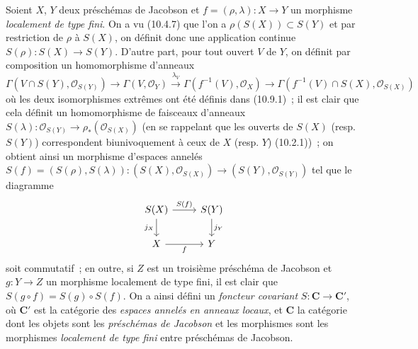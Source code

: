 \begin{env}[10.9.2]
\label{IV.10.9.2-fr}
Soient $X$, $Y$ deux préschémas de Jacobson et
$f=(\rho,\lambda):X\to Y$ un morphisme \emph{localement de type fini}. On a vu
(10.4.7) que l'on a $\rho(S(X))\subset S(Y)$ et par restriction de $\rho$ à
$S(X)$, on définit donc une application continue $S(\rho):S(X)\to S(Y)$.
D'autre part, pour tout ouvert $V$ de $Y$, on définit par composition un
homomorphisme d'anneaux
\[
  \Gamma(V\cap S(Y),\mathcal O_{S(Y)})\longrightarrow
  \Gamma(V,\mathcal O_Y)\xrightarrow{\lambda_V}
  \Gamma(f^{-1}(V),\mathcal O_X)\longrightarrow
  \Gamma(f^{-1}(V)\cap S(X),\mathcal O_{S(X)})
\]
où les deux isomorphismes extrêmes ont été définis dans (10.9.1)~; il est clair
que cela définit un homomorphisme de faisceaux d'anneaux
$S(\lambda):\mathcal O_{S(Y)}\to\rho_*(\mathcal O_{S(X)})$ (en se rappelant
que les ouverts de $S(X)$ (resp. $S(Y)$) correspondent biunivoquement à ceux de
$X$ (resp. $Y$) (10.2.1))~; on obtient ainsi un morphisme d'espaces annelés
$S(f)=(S(\rho),S(\lambda)):(S(X),\mathcal O_{S(X)})\longrightarrow
  (S(Y),\mathcal O_{S(Y)})$
tel que le diagramme
\[
\begin{tikzcd}
S(X) \ar[r,"S(f)"] \ar[d,"j_X"'] & S(Y) \ar[d,"j_Y"] \\
X \ar[r,"f"'] & Y
\end{tikzcd}
\]
soit commutatif~; en outre, si $Z$ est un troisième préschéma de Jacobson et
$g:Y\to Z$ un morphisme localement de type fini, il est clair que
$S(g\circ f)=S(g)\circ S(f)$. On a ainsi défini un \emph{foncteur covariant}
$S:\boldsymbol{C}\to\boldsymbol{C}'$, où $\boldsymbol{C}'$ est la catégorie des \emph{espaces
annelés en anneaux locaux}, et $\boldsymbol{C}$ la catégorie dont les objets sont les
\emph{préschémas de Jacobson} et les morphismes sont les morphismes
\emph{localement de type fini} entre préschémas de Jacobson.
\end{env}

